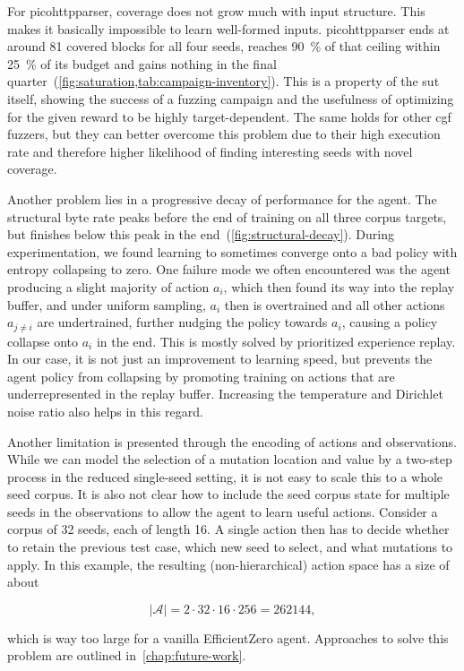 For picohttpparser, coverage does not grow much with input structure.
This makes it basically impossible to learn well-formed inputs.
picohttpparser ends at around \num{81} covered blocks for all four seeds,
reaches \SI{90}{\percent} of that ceiling within \SI{25}{\percent} of its
budget and gains nothing in the final
quarter~(\cref{fig:saturation,tab:campaign-inventory}).
This is a property of the \gls{sut} itself, showing the success of a fuzzing campaign
and the usefulness of optimizing for the given reward to be highly target-dependent.
The same holds for other \gls{cgf} fuzzers, but they can better overcome this problem
due to their high execution rate and therefore higher likelihood of finding interesting seeds
with novel coverage.

Another problem lies in a progressive decay of performance for the agent.
The structural byte rate peaks before the end of training on all three corpus targets,
but finishes below this peak in the end~(\cref{fig:structural-decay}).
During experimentation, we found learning to sometimes converge onto a bad policy
with entropy collapsing to zero.
One failure mode we often encountered was the agent producing a slight majority
of action $a_i$, which then found its way into the replay buffer, and under uniform
sampling, $a_i$ then is overtrained and all other actions $a_{j\neq i}$ are undertrained,
further nudging the policy towards $a_i$, causing a policy collapse onto $a_i$ in the end.
This is mostly solved by prioritized experience replay.
In our case, it is not just an improvement to learning speed, but prevents the
agent policy from collapsing by promoting training on actions that are underrepresented
in the replay buffer.
Increasing the temperature and Dirichlet noise ratio also helps in this regard.

Another limitation is presented through the encoding of actions and observations.
While we can model the selection of a mutation location and value by a two-step process
in the reduced single-seed setting, it is not easy to scale this to a whole seed corpus.
It is also not clear how to include the seed corpus state for multiple seeds in the
observations to allow the agent to learn useful actions.
Consider a corpus of 32 seeds, each of length 16.
A single action then has to decide whether to retain the previous test case, which
new seed to select, and what mutations to apply.
In this example, the resulting (non-hierarchical) action space has a size of about

\begin{equation}
  \label{eq:action-space-size}
  \lvert\mathcal{A}\rvert=2\cdot 32\cdot 16\cdot 256=262144,
\end{equation}

which is way too large for a vanilla EfficientZero agent.
Approaches to solve this problem are outlined in~\cref{chap:future-work}.
